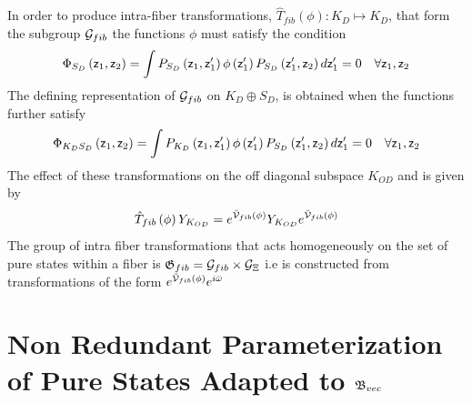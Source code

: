 In order to produce intra-fiber transformations, $\hat{T}_{fib}\left( \phi
\right) :K_{D}\mapsto K_{D}$, that form the subgroup ${\cal G}_{fib}$ the
functions $\phi $ must satisfy the condition 
\begin{equation}
\Phi _{S_{D}}\left( {\sf z}_{1},{\sf z}_{2}\right) =\int P_{S_{D}}\left( 
{\sf z}_{1},{\sf z}_{1}^{\prime }\right) \phi \left( {\sf z}_{1}^{\prime
}\right) P_{S_{D}}\left( {\sf z}_{1}^{\prime },{\sf z}_{2}\right) d{\sf z}%
_{1}^{\prime }=0\quad \forall {\sf z}_{1},{\sf z}_{2}
\end{equation}%
The defining representation of ${\cal G}_{fib}$ on $K_{D}\oplus S_{D}$, is
obtained when the functions further satisfy 
\begin{equation}
\Phi _{K_{D}S_{D}}\left( {\sf z}_{1},{\sf z}_{2}\right) =\int
P_{K_{D}}\left( {\sf z}_{1},{\sf z}_{1}^{\prime }\right) \phi \left( {\sf z}%
_{1}^{\prime }\right) P_{S_{D}}\left( {\sf z}_{1}^{\prime },{\sf z}%
_{2}\right) d{\sf z}_{1}^{\prime }=0\quad \forall {\sf z}_{1},{\sf z}_{2}
\end{equation}%
The effect of these transformations on the off diagonal subspace $K_{OD}$
and is given by 
\begin{equation}
\hat{T}_{fib}\left( \phi \right) Y_{K_{OD}}=e^{{\cal \breve{V}}_{fib}\left(
\phi \right) }Y_{K_{OD}}e^{{\cal \breve{V}}_{fib}\left( \phi \right) }
\end{equation}%
The group of intra fiber transformations that acts homogeneously on the set
of pure states within a fiber is ${\frak G}_{fib}={\cal G}_{fib}\times {\cal %
G}_{\Xi }$ i.e is constructed from transformations of the form $e^{{\cal 
\breve{V}}_{fib}\left( \phi \right) }e^{i\breve{\omega}}$

\section{Non Redundant Parameterization of Pure States Adapted to ${\frak B}%
_{vec}$}

